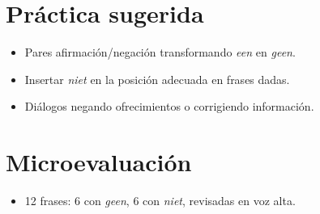\section{Práctica sugerida}
\begin{itemize}[leftmargin=*]
	\item Pares afirmación/negación transformando \textit{een} en \textit{geen}.
	\item Insertar \textit{niet} en la posición adecuada en frases dadas.
	\item Diálogos negando ofrecimientos o corrigiendo información.
\end{itemize}

\section{Microevaluación}
\begin{itemize}[leftmargin=*]
	\item 12 frases: 6 con \textit{geen}, 6 con \textit{niet}, revisadas en voz alta.
\end{itemize}

